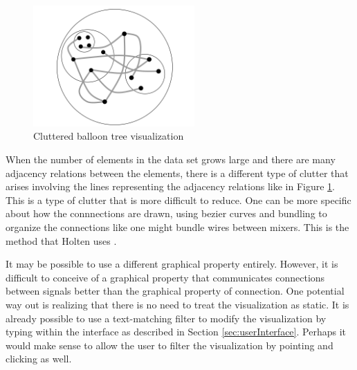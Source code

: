 \begin{figure}[htb]
\centering
\includegraphics[width=0.55\textwidth]{clutter_balloon.png}
\caption{Cluttered balloon tree visualization}
\label{fig:clutterBalloon}
\end{figure}

When the number of elements in the data set grows large and there are many adjacency relations between the elements, there is a different type of clutter that arises involving the lines representing the adjacency relations like in Figure \ref{fig:clutterBalloon}. This is a type of clutter that is more difficult to reduce. One can be more specific about how the connnections are drawn, using bezier curves and bundling to organize the connections like one might bundle wires between mixers. This is the method that Holten uses \cite{edgebundles2006}. 

It may be possible to use a different graphical property entirely. However, it is difficult to conceive of a graphical property that communicates connections between signals better than the graphical property of connection. One potential way out is realizing that there is no need to treat the visualization as static. It is already possible to use a text-matching filter to modify the visualization by typing within the interface as described in Section \ref{sec:userInterface}. Perhaps it would make sense to allow the user to filter the visualization by pointing and clicking as well.

